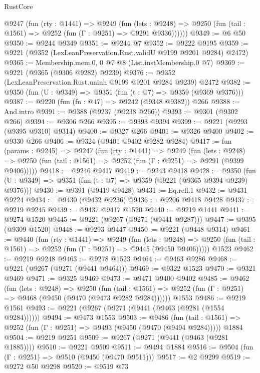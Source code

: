 \begin{lexlean}{RustCore}
\begin{coremodule}
      @9247
        (fun (rty : @1441) =>
        @9249
          (fun (lets : @9248) =>
          @9250 (fun (tail : @1561) => @9252 (fun (Γ : @9251) => @9291 @9336))))))
@9349 := @6 @50
@9350 := @9244 @9349
@9351 := @9244 @7
@9352 := @9222 @9195
@9359 := @9221 (@9352 (LexLeanPreservation.Rust.validU @9199 @9201 @9284) @2472)
@9365 := Membership.mem.{0, 0} @7 @8 (List.instMembership.{0} @7)
@9369 := @9221 (@9365 (@9306 @9282) @9239)
@9376 := @9352 (LexLeanPreservation.Rust.uninh @9199 @9201 @9284 @9239) @2472
@9382 := @9350 (fun (U : @9349) => @9351 (fun (t : @7) => @9359 (@9369 @9376)))
@9387 := @9220 (fun (fn : @47) => @9242 (@9348 @9382)) @266
@9388 := And.intro
@9391 := @9388 (@9237 (@9238 @266))
@9393 := @9301 (@9302 @266)
@9394 := @9306 @266
@9395 := @9393 @9394
@9399 := @9221 (@9293 (@9395 @9310) @9314)
@9400 := @9327 @266
@9401 := @9326 @9400
@9402 := @9330 @266
@9406 := @9324 (@9401 @9402 @9282 @9284)
@9417 := fun (params : @9245) =>
  @9247
    (fun (rty : @1441) =>
    @9249
      (fun (lets : @9248) =>
      @9250 (fun (tail : @1561) => @9252 (fun (Γ : @9251) => @9291 (@9399 @9406)))))
@9418 := @9246 @9417
@9419 := @9243 @9418
@9428 := @9350 (fun (U : @9349) => @9351 (fun (t : @7) => @9359 (@9221 (@9365 @9394 @9239) @9376)))
@9430 := @9391 (@9419 @9428)
@9431 := Eq.refl.{1}
@9432 := @9431 @9224
@9434 := @9430 (@9432 @9236)
@9436 := @9206 @9418 @9428
@9437 := @9219 @9245
@9439 := @9437 @9417 @1520
@9440 := @9219 @1441
@9441 := @9274 @1520
@9445 := @9221 (@9267 (@9271 (@9441 @9287)))
@9447 := @9395 (@9309 @1520)
@9448 := @9293 @9447
@9450 := @9221 (@9448 @9314)
@9461 := @9440
    (fun (rty : @1441) =>
    @9249
      (fun (lets : @9248) =>
      @9250 (fun (tail : @1561) => @9252 (fun (Γ : @9251) => @9445 (@9450 @9406)))))
    @1523
@9462 := @9219 @9248
@9463 := @9278 @1523
@9464 := @9463 @9286
@9468 := @9221 (@9267 (@9271 (@9441 @9464)))
@9469 := @9322 @1523
@9470 := @9321 @9469
@9471 := @9325 @9469
@9473 := @9471 @9400 @9402
@9485 := @9462
    (fun (lets : @9248) =>
    @9250
      (fun (tail : @1561) => @9252 (fun (Γ : @9251) => @9468 (@9450 (@9470 (@9473 @9282 @9284))))))
    @1553
@9486 := @9219 @1561
@9493 := @9221 (@9267 (@9271 (@9441 (@9463 (@9281 (@1554 @9284))))))
@9494 := @9473 @1553
@9503 := @9486
    (fun (tail : @1561) => @9252 (fun (Γ : @9251) => @9493 (@9450 (@9470 (@9494 @9284)))))
    @1884
@9504 := @9219 @9251
@9509 := @9267 (@9271 (@9441 (@9463 (@9281 @1885))))
@9510 := @9221 @9509
@9511 := @9494 @1884
@9516 := @9504 (fun (Γ : @9251) => @9510 (@9450 (@9470 @9511)))
@9517 := @2 @9299
@9519 := @9272 @50 @9298
@9520 := @9519 @73

\end{coremodule}
\end{lexlean}
